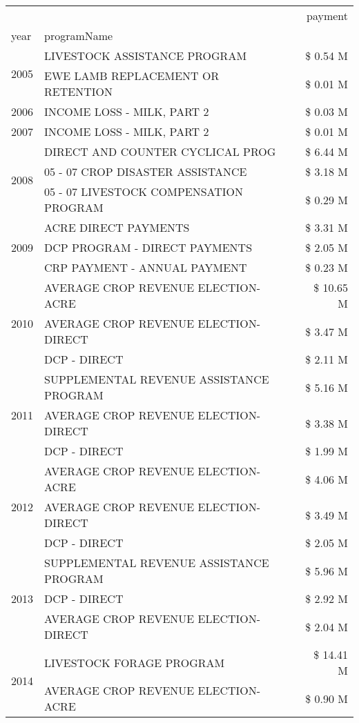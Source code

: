 \begin{tabular}{llr}
\toprule
 &  & payment \\
year & programName &  \\
\midrule
\multirow[t]{2}{*}{2005} & LIVESTOCK ASSISTANCE PROGRAM & \$ 0.54 M \\
 & EWE LAMB REPLACEMENT OR RETENTION & \$ 0.01 M \\
\cline{1-3}
2006 & INCOME LOSS - MILK, PART 2 & \$ 0.03 M \\
\cline{1-3}
2007 & INCOME LOSS - MILK, PART 2 & \$ 0.01 M \\
\cline{1-3}
\multirow[t]{3}{*}{2008} & DIRECT AND COUNTER CYCLICAL PROG & \$ 6.44 M \\
 & 05 - 07 CROP DISASTER ASSISTANCE & \$ 3.18 M \\
 & 05 - 07 LIVESTOCK COMPENSATION PROGRAM & \$ 0.29 M \\
\cline{1-3}
\multirow[t]{3}{*}{2009} & ACRE DIRECT PAYMENTS & \$ 3.31 M \\
 & DCP PROGRAM - DIRECT PAYMENTS & \$ 2.05 M \\
 & CRP PAYMENT - ANNUAL PAYMENT & \$ 0.23 M \\
\cline{1-3}
\multirow[t]{3}{*}{2010} & AVERAGE CROP REVENUE ELECTION-ACRE & \$ 10.65 M \\
 & AVERAGE CROP REVENUE ELECTION-DIRECT & \$ 3.47 M \\
 & DCP - DIRECT & \$ 2.11 M \\
\cline{1-3}
\multirow[t]{3}{*}{2011} & SUPPLEMENTAL REVENUE ASSISTANCE PROGRAM & \$ 5.16 M \\
 & AVERAGE CROP REVENUE ELECTION-DIRECT & \$ 3.38 M \\
 & DCP - DIRECT & \$ 1.99 M \\
\cline{1-3}
\multirow[t]{3}{*}{2012} & AVERAGE CROP REVENUE ELECTION-ACRE & \$ 4.06 M \\
 & AVERAGE CROP REVENUE ELECTION-DIRECT & \$ 3.49 M \\
 & DCP - DIRECT & \$ 2.05 M \\
\cline{1-3}
\multirow[t]{3}{*}{2013} & SUPPLEMENTAL REVENUE ASSISTANCE PROGRAM & \$ 5.96 M \\
 & DCP - DIRECT & \$ 2.92 M \\
 & AVERAGE CROP REVENUE ELECTION-DIRECT & \$ 2.04 M \\
\cline{1-3}
\multirow[t]{3}{*}{2014} & LIVESTOCK FORAGE PROGRAM & \$ 14.41 M \\
 & AVERAGE CROP REVENUE ELECTION-ACRE & \$ 0.90 M \\

\end{tabular}
